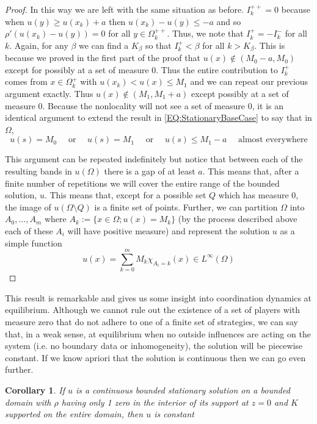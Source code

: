 \documentclass[aps,
preprint,
groupedaddress,
showkeys,
amsmath]{revtex4-2}
\newtheorem{corollary}{Corollary}
\begin{document}
\begin{proof}
        In this way we are left with the same situation as before. $I^{++}_k=0$ because when $u(y)\geq u(x_k)+a$ then $u(x_k)-u(y)\leq -a$ and so $\rho'(u(x_k)-u(y))=0$ for all $y\in \Omega_k^{++}$. Thus, we note that $I^+_k=-I^-_k$ for all $k$. Again, for any $\beta$ we can find a $K_\beta$ so that $I^+_k<\beta$ for all $k>K_\beta$. This is because we proved in the first part of the proof that $u(x)\notin (M_0-a,M_0)$ except for possibly at a set of measure $0$. Thus the entire contribution to $I^+_k$ comes from $x\in \Omega^+_k$ with $u(x_k)<u(x)\leq M_1$ and we can repeat our previous argument exactly. Thus $u(x)\notin (M_1,M_1+a)$ except possibly at a set of measure $0$. Because the nonlocality will not see a set of measure $0$, it is an identical argument to extend the result in \eqref{EQ:StationaryBaseCase} to say that in $\Omega$,
        \[u(s)=M_0\quad \text{ or } \quad u(s)=M_1 \quad\text{ or } \quad u(s)\leq M_1-a \quad\text{ almost everywhere}\]

        This argument can be repeated indefinitely but notice that between each of the resulting bands in $u(\Omega)$ there is a gap of at least $a$. This means that, after a finite number of repetitions we will cover the entire range of the bounded solution, $u$. This means that, except for a possible set $Q$ which has measure 0, the image of $u(\Omega\setminus Q)$ is a finite set of points. Further, we can partition $\Omega$ into $A_0,...,A_m$ where $A_k:=\{x\in \Omega; u(x)=M_k\}$ (by the process described above each of these $A_i$ will have positive measure) and represent the solution $u$ as a simple function
        \[u(x)= \sum_{k=0}^mM_k\chi_{A_i=k}(x)\in L^\infty(\Omega)\] 
    \end{proof}

    This result is remarkable and gives us some insight into coordination dynamics at equilibrium. Although we cannot rule out the existence of a set of players with measure zero that do not adhere to one of a finite set of strategies, we can say that, in a weak sense, at equilibrium when no outside influences are acting on the system (i.e. no boundary data or inhomogeneity), the solution will be piecewise constant. If we know apriori that the solution is continuous then we can go even further.
    \begin{corollary}\label{COR:ContinuousStationarySolution}
        If $u$ is a continuous bounded stationary solution on a bounded domain with $\rho$ having only 1 zero in the interior of its support at $z=0$ and $K$ supported on the entire domain,  then $u$ is constant
    \end{corollary}
    
\end{document}
